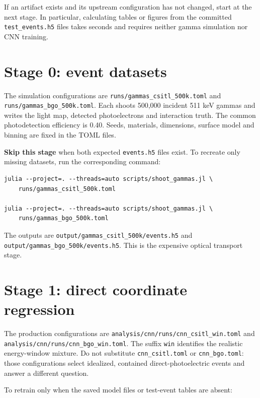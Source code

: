 \documentclass[11pt,a4paper]{article}
\newcommand{\code}[1]{\nolinkurl{#1}}
\begin{document}
If an artifact exists and its upstream configuration has not changed, start at
the next stage. In particular, calculating tables or figures from the committed
\code{test\_events.h5} files takes seconds and requires neither gamma simulation
nor CNN training.

\section{Stage 0: event datasets}

The simulation configurations are
\code{runs/gammas\_csitl\_500k.toml} and
\code{runs/gammas\_bgo\_500k.toml}. Each shoots 500,000 incident 511 keV
gammas and writes the light map, detected photoelectrons and interaction truth.
The common photodetection efficiency is 0.40. Seeds, materials, dimensions,
surface model and binning are fixed in the TOML files.

\textbf{Skip this stage} when both expected \code{events.h5} files exist. To
recreate only missing datasets, run the corresponding command:

\begin{verbatim}
julia --project=. --threads=auto scripts/shoot_gammas.jl \
    runs/gammas_csitl_500k.toml

julia --project=. --threads=auto scripts/shoot_gammas.jl \
    runs/gammas_bgo_500k.toml
\end{verbatim}

The outputs are \code{output/gammas\_csitl\_500k/events.h5} and
\code{output/gammas\_bgo\_500k/events.h5}. This is the expensive optical
transport stage.

\section{Stage 1: direct coordinate regression}
\label{sec:direct}

The production configurations are
\code{analysis/cnn/runs/cnn\_csitl\_win.toml} and
\code{analysis/cnn/runs/cnn\_bgo\_win.toml}. The suffix \code{win} identifies
the realistic energy-window mixture. Do not substitute \code{cnn\_csitl.toml}
or \code{cnn\_bgo.toml}: those configurations select idealized, contained
direct-photoelectric events and answer a different question.

To retrain only when the saved model files or test-event tables are absent:
\end{document}
